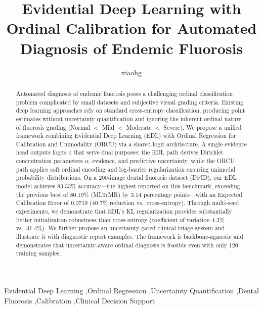 \documentclass[final,12pt]{elsarticle}
\begin{document}
\begin{frontmatter}

\title{Evidential Deep Learning with Ordinal Calibration for Automated Diagnosis of Endemic Fluorosis}

\author{xiaohg}

\address{School of Computer Science and Technology, Guizhou University, Guiyang, China}


\begin{abstract}
Automated diagnosis of endemic fluorosis poses a challenging ordinal classification problem complicated by small datasets and subjective visual grading criteria. Existing deep learning approaches rely on standard cross-entropy classification, producing point estimates without uncertainty quantification and ignoring the inherent ordinal nature of fluorosis grading (Normal $<$ Mild $<$ Moderate $<$ Severe). We propose a unified framework combining Evidential Deep Learning (EDL) with Ordinal Regression for Calibration and Unimodality (ORCU) via a shared-logit architecture. A single evidence head outputs logits $z$ that serve dual purposes: the EDL path derives Dirichlet concentration parameters $\alpha$, evidence, and predictive uncertainty, while the ORCU path applies soft ordinal encoding and log-barrier regularization ensuring unimodal probability distributions. On a 200-image dental fluorosis dataset (DFID), our EDL model achieves 83.33\% accuracy---the highest reported on this benchmark, exceeding the previous best of 80.19\% (MLTrMR) by 3.14 percentage points---with an Expected Calibration Error of 0.0719 (40.7\% reduction vs.\ cross-entropy). Through multi-seed experiments, we demonstrate that EDL's KL regularization provides substantially better initialization robustness than cross-entropy (coefficient of variation 4.3\% vs.\ 31.4\%). We further propose an uncertainty-gated clinical triage system and illustrate it with diagnostic report examples. The framework is backbone-agnostic and demonstrates that uncertainty-aware ordinal diagnosis is feasible even with only 120 training samples.

\end{abstract}

\begin{keyword}
Evidential Deep Learning \sep Ordinal Regression \sep Uncertainty Quantification \sep Dental Fluorosis \sep Calibration \sep Clinical Decision Support
\end{keyword}

\end{frontmatter}
\end{document}
